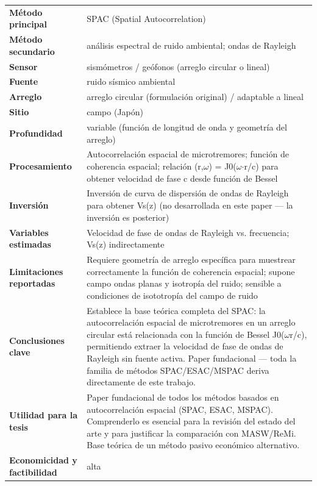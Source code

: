 \begin{center}\scriptsize
\begin{tabularx}{\textwidth}{@{}>{\bfseries}p{3.3cm} X@{}}
\toprule
M\'etodo principal & SPAC (Spatial Autocorrelation) \\
M\'etodo secundario & análisis espectral de ruido ambiental; ondas de Rayleigh \\
Sensor & sismómetros / geófonos (arreglo circular o lineal) \\
Fuente & ruido sísmico ambiental \\
Arreglo & arreglo circular (formulación original) / adaptable a lineal \\
Sitio & campo (Japón) \\
Profundidad & variable (función de longitud de onda y geometría del arreglo) \\
Procesamiento & Autocorrelación espacial de microtremores; función de coherencia espacial; relación (r,$\omega$) = J0($\omega$$\cdot$r/c) para obtener velocidad de fase c desde función de Bessel \\
Inversi\'on & Inversión de curva de dispersión de ondas de Rayleigh para obtener Vs(z) (no desarrollada en este paper --- la inversión es posterior) \\
Variables estimadas & Velocidad de fase de ondas de Rayleigh vs. frecuencia; Vs(z) indirectamente \\
Limitaciones reportadas & Requiere geometría de arreglo específica para muestrear correctamente la función de coherencia espacial; supone campo ondas planas y isotropía del ruido; sensible a condiciones de isototropía del campo de ruido \\
Conclusiones clave & Establece la base teórica completa del SPAC: la autocorrelación espacial de microtremores en un arreglo circular está relacionada con la función de Bessel J0($\omega$r/c), permitiendo extraer la velocidad de fase de ondas de Rayleigh sin fuente activa. Paper fundacional --- toda la familia de métodos SPAC/ESAC/MSPAC deriva directamente de este trabajo. \\
Utilidad para la tesis & Paper fundacional de todos los métodos basados en autocorrelación espacial (SPAC, ESAC, MSPAC). Comprenderlo es esencial para la revisión del estado del arte y para justificar la comparación con MASW/ReMi. Base teórica de un método pasivo económico alternativo. \\
Economicidad y factibilidad & alta \\
\bottomrule
\end{tabularx}
\end{center}

